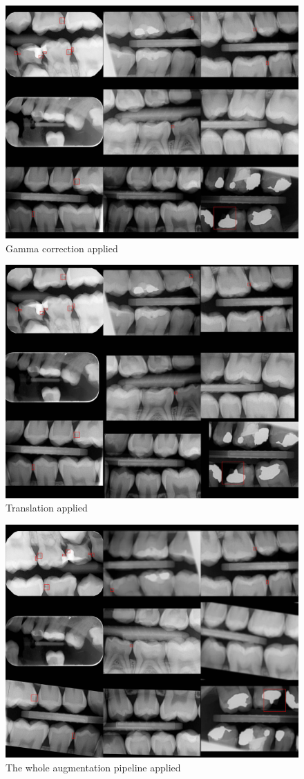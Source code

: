 \begin{figure}
    \includegraphics[width =0.8\linewidth]{images/random_gamma.jpg}
    \caption{Gamma correction applied}
\end{figure}
\begin{figure}
    \includegraphics[width =0.8\linewidth]{images/translate.jpg}
    \caption{Translation applied}
\end{figure}
\begin{figure}
    \includegraphics[width =0.8\linewidth]{images/all_transf.jpg}
    \caption{The whole augmentation pipeline applied}
\end{figure}